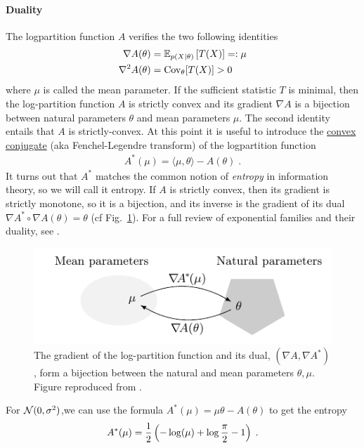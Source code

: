 \documentclass{article}
\newenvironment{example}{
	\begin{mdframed}[backgroundcolor=light-gray, roundcorner=5pt]
}{		
	\end{mdframed}
}
\newcommand*{\expect}[2][]{\ensuremath{\mathbb{E}_{#1} \left[ #2 \right] }} %
\newcommand{\logpart}{A}
\newcommand{\conj}{\logpart^*}
\newcommand{\natp}{\theta}
\newcommand{\meanp}{\mu}
\begin{document}
\paragraph{Duality}
The logpartition function $\logpart$ verifies the two following identities
\begin{align}
    \nabla\logpart(\natp) &=  \expect[p(X|\natp)]{T(X)} =: \meanp \\
    \nabla^2 \logpart(\natp) &= \Cov_\natp[T(X)] > 0
\end{align}
where $\meanp$ is called the mean parameter.
If the sufficient statistic $T$ is minimal, then the log-partition function $\logpart$ is strictly convex and its gradient $\nabla \logpart$ is a bijection between natural parameters $\natp$ and mean parameters $\mu$.
The second identity entails that $\logpart$ is strictly-convex. 
At this point it is useful to introduce the \href{https://en.wikipedia.org/wiki/Convex_conjugate}{convex conjugate} (aka Fenchel-Legendre transform) of the logpartition function
\begin{align}
	\conj(\mu) = \langle \mu, \natp \rangle - \logpart(\natp) \; .
\end{align}
It turns out that $\conj$ matches the common notion of \textit{entropy} in information theory, so we will call it entropy.
If $\logpart$ is strictly convex, then its gradient is strictly monotone, so it is a bijection, and its inverse is the gradient of its dual $\nabla\conj \circ \nabla\logpart(\natp) = \natp$ (cf Fig.~\ref{fig:duality}).
For a full review of exponential families and their duality, see \citet[Chapter 3]{wainwright2008graphical}.
\begin{figure}[h]
	\centering
	\includegraphics{figs/duality}
	\caption{The gradient of the log-partition function and its dual, $(\nabla \logpart, \nabla \conj)$, form a bijection between the natural and mean parameters $\natp, \meanp$. Figure reproduced from \citet{kunstner2020homeomorphic}.}
	\label{fig:duality}
\end{figure}
\begin{example}
		For ${\mathcal N}(0,\sigma^2)$,we can use the formula $\conj(\mu) = \mu \natp - \logpart(\natp)$ to get the entropy
\begin{align}
	\conj(\mu) = \half\left( -\log(\mu) + \log\frac{\pi}{2} - 1 \right) \; .
\end{align}
\end{example}
\end{document}
